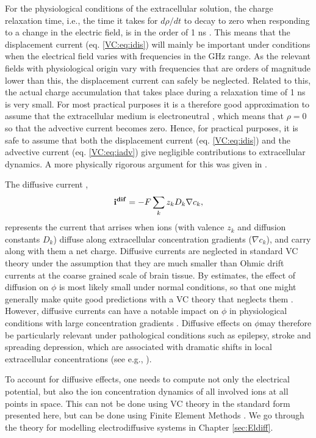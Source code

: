 For the physiological conditions of the extracellular solution, the charge relaxation time, i.e., the time it takes for $d\rho/dt$ to decay to zero when responding to a change in the electric field, is in the order of 1 ns \citep{Grodzinsky2011, Gratiy2017}. This means that the displacement current (eq. \ref{VC:eq:idis}) will mainly be important under conditions when the electrical field varies with frequencies in the GHz range. As the relevant fields with physiological origin vary with frequencies that are orders of magnitude lower than this, the displacement current can safely be neglected. Related to this, the actual charge accumulation that takes place during a relaxation time of 1 ns is very small. For most practical purposes it is a therefore good approximation to assume that the extracellular medium is electroneutral \citep{Solbra2018}, which means that $\rho = 0$ so that the advective current becomes zero. Hence, for practical purposes, it is safe to assume that both the displacement current (eq. \ref{VC:eq:idis}) and the advective current (eq. \ref{VC:eq:iadv}) give negligible contributions to extracellular dynamics. A more physically rigorous argument for this was given in \citep{Gratiy2017}. 

The diffusive current ,
\begin{equation}
{\bf i^{dif}} = -F \sum_k z_k D_k \nabla c_k,
\label{VC:eq:idif}
\end{equation}
represents the current that arrises when ions (with valence $z_k$ and diffusion constants $D_k$) diffuse along extracellular concentration gradients ($\nabla c_k$), and carry along with them a net charge. Diffusive currents are neglected in standard VC theory under the assumption that they are much smaller than Ohmic drift currents at the coarse grained scale of brain tissue. By estimates, the effect of diffusion on $\phi$ is most likely small under normal conditions, 
so that one might generally make quite good predictions with a VC theory that neglects them \citep{Halnes2016, Gratiy2017}. 
However, diffusive currents can have a notable impact on $\phi$ in physiological conditions with large concentration gradients \citep{Halnes2016, Gratiy2017}. Diffusive effects on $\phi$may therefore be particularly relevant under pathological conditions such as epilepsy, stroke and spreading depression, which are associated with dramatic shifts in local extracellular concentrations (see e.g.,  \citep{Somjen2001, Frohlich2008, Wei2014, Ayata2015}). 

To account for diffusive effects, one needs to compute not only the electrical potential, but also the ion concentration dynamics of all involved ions at all points in space. This can not be done using VC theory in the standard form presented here, but can be done using Finite Element Methods \citep{Solbra2018}. We go through the theory for modelling electrodiffusive systems in Chapter \ref{sec:Eldiff}.


